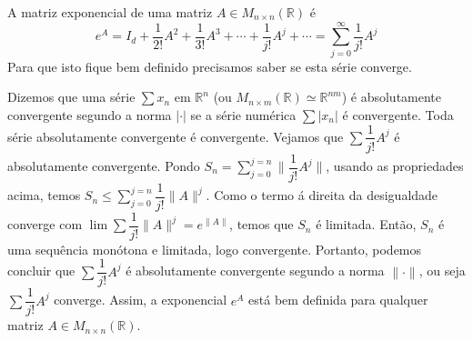 \documentclass[a4paper, 12pt]{article}
\renewcommand{\Bbb}{\mathbb}
\begin{document}
A matriz exponencial de uma matriz $A\in M_{n\times n}(\Bbb R)$ é 
$$e^A=I_d+\dfrac{1}{2!}A^2+\dfrac{1}{3!}A^3+\cdots+\dfrac{1}{j!}A^j+\cdots=\sum^{\infty}_{j=0}\dfrac{1}{j!}A^j$$
Para que isto fique bem definido precisamos saber se esta série converge.

Dizemos que uma série $\sum x_n$ em $\Bbb R^n$ (ou $M_{n\times m}(\Bbb R) \simeq \Bbb R^{nm}$) é absolutamente convergente segundo a norma $|\cdot|$ se a série numérica $\sum|x_n|$ é convergente. Toda série absolutamente convergente é convergente. Vejamos que $\sum\dfrac{1}{j!}A^j$ é absolutamente convergente. Pondo $S_n = \sum^{j=n}_{j=0}\lVert \dfrac{1}{j!}A^j\rVert$, usando as propriedades acima, temos $S_n\leq \sum^{j=n}_{j=0}\dfrac{1}{j!}\lVert A\rVert^j$. Como o termo á direita da desigualdade converge com $\lim\sum\dfrac{1}{j!}\lVert A\rVert^j=e^{\lVert A\rVert}$, temos que $S_n$ é limitada. Então, $S_n$ é uma sequência monótona e limitada, logo convergente. Portanto, podemos concluir que $\sum\dfrac{1}{j!}A^j$ é absolutamente convergente segundo a norma $\lVert \cdot\rVert$, ou seja $\sum\dfrac{1}{j!}A^j$ converge. Assim, a exponencial $e^A$ está bem definida para qualquer matriz $A\in M_{n\times n}(\Bbb R)$.
\end{document}
